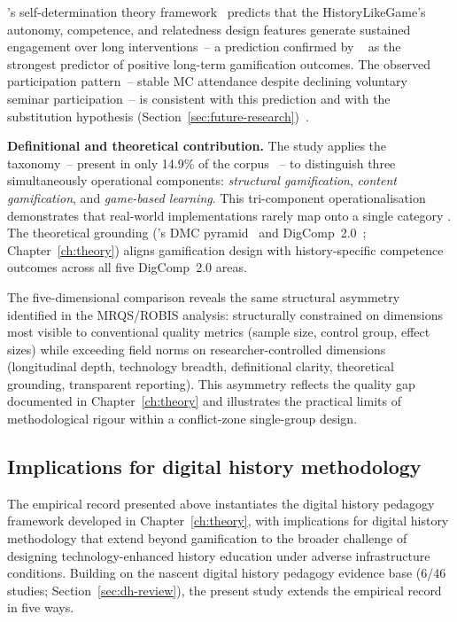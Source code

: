 \citeauthor{RyanDeci2000}'s self-determination theory framework~\cite{RyanDeci2000} predicts that the HistoryLikeGame's autonomy, competence, and relatedness design features generate sustained engagement over long interventions~-- a prediction confirmed by \citeauthor{vanRoyZaman2019}~\cite{vanRoyZaman2019} as the strongest predictor of positive long-term gamification outcomes. The observed participation pattern~-- stable MC attendance despite declining voluntary seminar participation~-- is consistent with this prediction and with the substitution hypothesis (Section~\ref{sec:future-research})~\cite{KoivistoHamari2019}.

\textbf{Definitional and theoretical contribution.}
The study applies the \citeauthor{Deterding2011}~\cite{Deterding2011} taxonomy~-- present in only 14.9\% of the corpus \cite{KorniienkoSemerikov2024}~-- to distinguish three simultaneously operational components: \emph{structural gamification}, \emph{content gamification}, and \emph{game-based learning}. This tri-component operationalisation demonstrates that real-world implementations rarely map onto a single category \cite{SEABORN201514, Zhonggen2019, Unkelos-Shpigel2016}. The theoretical grounding (\citeauthor{Werbach2012}'s DMC pyramid~\cite{Werbach2012} and DigComp~2.0~\cite{Vuorikari2016}; Chapter~\ref{ch:theory}) aligns gamification design with history-specific competence outcomes across all five DigComp~2.0 areas.

The five-dimensional comparison reveals the same structural asymmetry identified in the MRQS/ROBIS analysis: structurally constrained on dimensions most visible to conventional quality metrics (sample size, control group, effect sizes) while exceeding field norms on researcher-controlled dimensions (longitudinal depth, technology breadth, definitional clarity, theoretical grounding, transparent reporting). This asymmetry reflects the quality gap documented in Chapter~\ref{ch:theory} \cite{Korniienko2025mrqs} and illustrates the practical limits of methodological rigour within a conflict-zone single-group design.

\subsection{Implications for digital history methodology}

\label{sec:dh-methodology}

The empirical record presented above instantiates the digital history
pedagogy framework developed in Chapter~\ref{ch:theory}, with implications
for digital history methodology that extend beyond gamification to the broader challenge
of designing technology-enhanced history education under adverse infrastructure conditions.
Building on the nascent digital history pedagogy evidence base (6/46 studies; Section~\ref{sec:dh-review}), the present study extends the empirical record in five ways.


